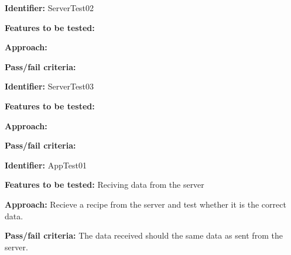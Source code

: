\documentclass[a4paper,12pt]{memoir}
\newcommand{\testdesign}[4]
{
\begin{framed}
\begin{description}
\item \textbf{Identifier:} #1
\item \textbf{Features to be tested:} #2
\item \textbf{Approach:} #3
\item \textbf{Pass/fail criteria:} #4
\end{description}
\end{framed}
}
\begin{document}
\testdesign
{ServerTest02} %
{} %
{} %
{} %

\testdesign
{ServerTest03} %
{} %
{} %
{} %

\testdesign
{AppTest01} %
{Reciving data from the server} %
{Recieve a recipe from the server and test whether it is the correct data.} %
{The data received should the same data as sent from the server.} %
\end{document}
